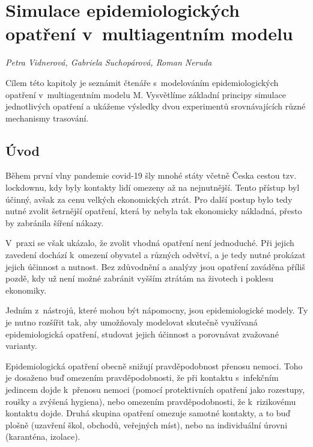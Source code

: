 
\chapter[Simulace v~multiagentním modelu]{Simulace epidemiologických opatření v~multiagentním modelu}
\label{Evaluace_politik}

\textit{Petra Vidnerová, Gabriela Suchopárová, Roman Neruda}
\vspace{15mm}

Cílem této kapitoly je seznámit čtenáře s~modelováním
epidemiologických opatření v~multiagentním modelu M. Vysvětlíme
základní principy simulace jednotlivých opatření a ukážeme výsledky
dvou experimentů srovnávajících různé mechanismy trasování.


\section*{Úvod}

Během první vlny pandemie covid-19 šly mnohé státy včetně Česka
cestou tzv. lockdownu, kdy byly kontakty lidí omezeny až na
nejnutnější. Tento přístup byl účinný, avšak za cenu velkých
ekonomických ztrát. Pro další postup bylo tedy nutné zvolit šetrnější
opatření, která by nebyla tak ekonomicky nákladná, přesto by zabránila
šíření nákazy.

V~praxi se však ukázalo, že zvolit vhodná opatření není
jednoduché. Při jejich zavedení dochází k~omezení obyvatel a různých
odvětví, a je tedy nutné prokázat jejich účinnost a nutnost. Bez
zdůvodnění a analýzy jsou opatření zaváděna příliš pozdě, kdy už není
možné zabránit vyšším ztrátám na životech i poklesu ekonomiky.

Jedním z~nástrojů, které mohou být nápomocny, jsou epidemiologické
modely. Ty je nutno rozšířit tak, aby umožňovaly modelovat skutečně
využívaná epidemiologická opatření, studovat jejich účinnost a
porovnávat zvažované varianty.

Epidemiologická opatření obecně snižují pravděpodobnost přenosu nemoci. Toho
je dosaženo buď omezením pravděpodobnosti, že při kontaktu s~infekčním jedincem
dojde k~přenosu nemoci (pomocí protektivních opatření jako rozestupy, roušky
a zvýšená hygiena), nebo omezením pravděpodobnosti, že k~rizikovému kontaktu
dojde. Druhá skupina opatření omezuje samotné kontakty, a to buď plošně
(uzavření škol, obchodů, veřejných míst), nebo na individuální úrovni
(karanténa, izolace).




